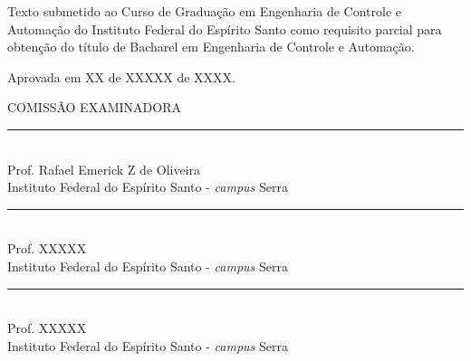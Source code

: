 {
    \center          
    {\large\MakeUppercase{\imprimirautor}}\par
    \vfill
    {\bfseries\large\MakeUppercase\imprimirtitulo}\par
    \vspace{10 mm}
    \hspace{.35\textwidth}
    \begin{minipage}{.6\textwidth}
        \SingleSpacing
        Texto submetido ao Curso de Graduação em Engenharia de Controle e Automação do Instituto Federal do Espírito Santo como requisito parcial para obtenção do título de Bacharel em Engenharia de Controle e Automação. 
    \end{minipage}
    
    \vspace{1.5cm}
    
    Aprovada em XX de XXXXX de XXXX.
    
    \vspace{0.8cm}
    
    \MakeUppercase{Comissão Examinadora}
    
    \vspace{0.8cm}
    
    \rule{12cm}{1pt} \\
    Prof. Rafael Emerick Z de Oliveira \\
    Instituto Federal do Espírito Santo - \textit{campus} Serra
    
    \vspace{0.8cm}
    \rule{12cm}{1pt} \\
    Prof. XXXXX \\
    Instituto Federal do Espírito Santo - \textit{campus} Serra
    
    \vspace{0.8cm}
    \rule{12cm}{1pt} \\
    Prof. XXXXX \\
    Instituto Federal do Espírito Santo - \textit{campus} Serra
    
    
    \vfill
    {\large\MakeUppercase\imprimirlocal}\par
    {\large\imprimirdata}\par
}